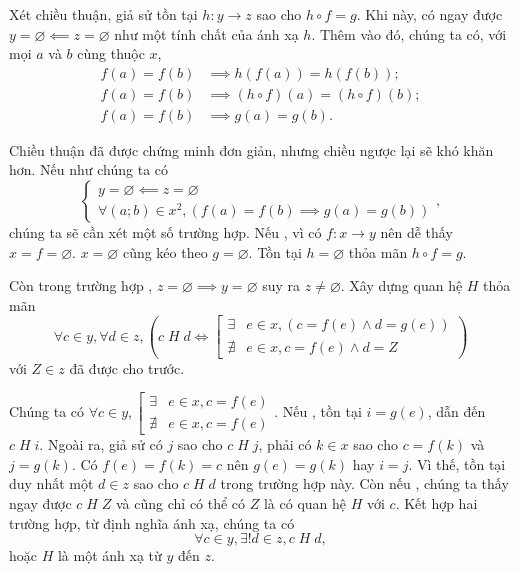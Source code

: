\solution

Xét chiều thuận, giả sử tồn tại $h: y \to z$ sao cho $h \circ f = g$. Khi này, có ngay được $y = \varnothing \impliedby z = \varnothing$ như một tính chất của ánh xạ $h$. Thêm vào đó, chúng ta có, với mọi $a$ và $b$ cùng thuộc $x$, 
\begin{align*}
   f(a) = f(b) &\implies h(f(a)) = h(f(b)); \\
   f(a) = f(b) &\implies (h \circ f)(a) = (h \circ f)(b); \\
   f(a) = f(b) &\implies g(a) = g(b).
\end{align*}

Chiều thuận đã được chứng minh đơn giản, nhưng chiều ngược lại sẽ khó khăn hơn. Nếu như chúng ta có \begin{equation*}
   \begin{cases}
      y = \varnothing \impliedby z = \varnothing \\
      \forall (a; b) \in x^2, (f(a) = f(b) \implies g(a) = g(b))
   \end{cases},
\end{equation*}
chúng ta sẽ cần xét một số trường hợp. Nếu , vì có $f:x \to y$ nên dễ thấy $x = f = \varnothing$. $x = \varnothing$ cũng kéo theo $g = \varnothing$. Tồn tại $h = \varnothing$ thỏa mãn $h \circ f = g$.

Còn trong trường hợp , $z = \varnothing \implies y =\varnothing$ suy ra $z \neq \varnothing$. Xây dựng quan hệ $H$ thỏa mãn
\begin{equation*}
   \forall c \in y, \forall d \in z, \left(c\;H\;d \iff \left[\begin{aligned}
      \exists &e \in x, \left(c = f(e) \land d = g(e)\right) \\
      \nexists &e \in x, c = f(e) \land d = Z 
   \end{aligned}\right.\right)
\end{equation*} 
với $Z \in z$ đã được cho trước.

Chúng ta có $
   \forall c \in y, \left[\begin{aligned}
      \exists &e \in x, c = f(e) \\
      \nexists &e \in x, c = f(e)
   \end{aligned}\right..
$ Nếu , tồn tại $i = g(e)$, dẫn đến $c\;H\;i$. Ngoài ra, giả sử có $j$ sao cho $c\;H\;j$, phải có $k \in x$ sao cho $c = f(k)$ và $j = g(k)$. Có $f(e) = f(k) = c$ nên $g(e) = g(k)$ hay $i = j$. Vì thế, tồn tại duy nhất một $d \in z$ sao cho $c\;H\;d$ trong trường hợp này. Còn nếu , chúng ta thấy ngay được $c\;H\;Z$ và cũng chỉ có thể có $Z$ là có quan hệ $H$ với $c$. Kết hợp hai trường hợp, từ định nghĩa ánh xạ, chúng ta có 
\begin{equation*}
   \forall c \in y, \exists ! d \in z, c\;H\;d,
\end{equation*}
hoặc $H$ là một ánh xạ từ $y$ đến $z$.


